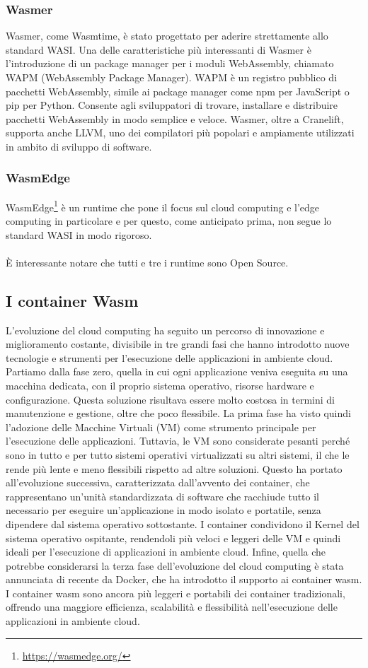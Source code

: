 \subsubsection{Wasmer}
Wasmer, come Wasmtime, è stato progettato per aderire strettamente allo standard WASI. Una delle caratteristiche più
interessanti di Wasmer è l'introduzione di un package manager per i moduli WebAssembly, chiamato WAPM (WebAssembly
Package Manager). WAPM è un registro pubblico di pacchetti WebAssembly, simile ai package manager come npm per
JavaScript o pip per Python. Consente agli sviluppatori di trovare, installare e distribuire pacchetti WebAssembly in
modo semplice e veloce. Wasmer, oltre a Cranelift, supporta anche LLVM, uno dei compilatori più popolari e ampiamente
utilizzati in ambito di sviluppo di software.

\subsubsection{WasmEdge}
WasmEdge\footnote{\url{https://wasmedge.org/}} è un runtime che pone il focus sul cloud computing e l'edge computing in
particolare e per questo, come anticipato prima, non segue lo standard WASI in modo rigoroso. \\
\\
È interessante notare che tutti e tre i runtime sono Open Source.
\subsection{I container Wasm}
L'evoluzione del cloud computing ha seguito un percorso di innovazione e miglioramento costante, divisibile in tre
grandi fasi che hanno introdotto nuove tecnologie e strumenti per l'esecuzione delle applicazioni in ambiente cloud.
Partiamo dalla fase zero, quella in cui ogni applicazione veniva eseguita su una macchina dedicata, con il proprio
sistema operativo, risorse hardware e configurazione. Questa soluzione risultava essere molto costosa in termini di
manutenzione e gestione, oltre che poco flessibile. La prima fase ha visto quindi l'adozione delle Macchine Virtuali
(VM) come strumento principale per l'esecuzione delle applicazioni. Tuttavia, le VM sono considerate pesanti perché sono
in tutto e per tutto sistemi operativi virtualizzati su altri sistemi, il che le rende più lente e meno flessibili
rispetto ad altre soluzioni. Questo ha portato all'evoluzione successiva, caratterizzata dall'avvento dei container, che
rappresentano un'unità standardizzata di software che racchiude tutto il necessario per eseguire un'applicazione in modo
isolato e portatile, senza dipendere dal sistema operativo sottostante. I container condividono il Kernel del sistema
operativo ospitante, rendendoli più veloci e leggeri delle VM e quindi ideali per l'esecuzione di applicazioni in
ambiente cloud. Infine, quella che potrebbe considerarsi la terza fase dell'evoluzione del cloud computing è stata
annunciata di recente da Docker, che ha introdotto il supporto ai container wasm\cite{docker-wasm-tech-preview}. I
container wasm sono ancora più leggeri e portabili dei container tradizionali, offrendo una maggiore efficienza,
scalabilità e flessibilità nell'esecuzione delle applicazioni in ambiente cloud.

